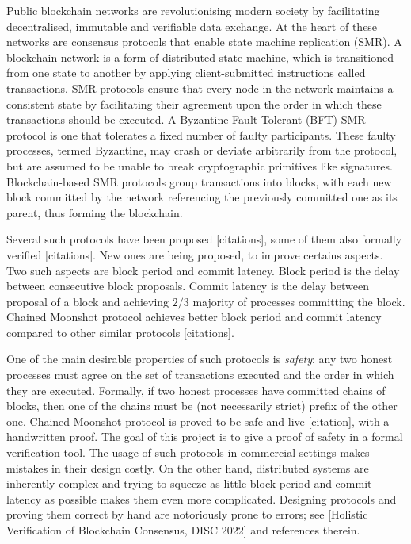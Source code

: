Public blockchain networks are revolutionising modern society by facilitating decentralised, immutable and verifiable data exchange. At the heart of these networks are consensus protocols that enable state machine replication (SMR). A blockchain network is a form of distributed state machine, which is transitioned from one state to another by applying client-submitted instructions called transactions. SMR protocols ensure that every node in the network maintains a consistent state by facilitating their agreement upon the order in which these transactions should be executed. A Byzantine Fault Tolerant (BFT) SMR protocol is one that tolerates a fixed number of faulty participants. These faulty processes, termed Byzantine, may crash or deviate arbitrarily from the protocol, but are assumed to be unable to break cryptographic primitives like signatures. Blockchain-based SMR protocols group transactions into blocks, with each new block committed by the network referencing the previously committed one as its parent, thus forming the blockchain.

Several such protocols have been proposed [citations], some of them also formally verified [citations]. New ones are being proposed, to improve certains aspects. Two such aspects are block period and commit latency. Block period is the delay between consecutive block proposals. Commit latency is the delay between proposal of a block and achieving $2/3$ majority of processes committing the block. Chained Moonshot protocol achieves better block period and commit latency compared to other similar protocols [citations].

One of the main desirable properties of such protocols is \emph{safety}: any two honest processes must agree on the set of transactions executed and the order in which they are executed. Formally, if two honest processes have committed chains of blocks, then one of the chains must be (not necessarily strict) prefix of the other one. Chained Moonshot protocol is proved to be safe and live [citation], with a handwritten proof. The goal of this project is to give a proof of safety in a formal verification tool. The usage of such protocols in commercial settings makes mistakes in their design costly. On the other hand, distributed systems are inherently complex and trying to squeeze as little block period and commit latency as possible makes them even more complicated. Designing protocols and proving them correct by hand are notoriously prone to errors; see [Holistic Verification of Blockchain Consensus, DISC 2022] and references therein.

